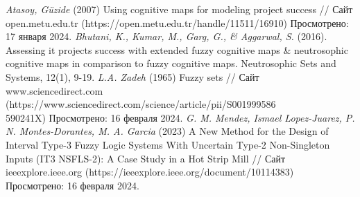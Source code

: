 \documentclass{article}
\begin{document}
\begin{minipage}{0.49\textwidth}
\begin{thebibliography}{}
             \textit{Atasoy, Güzide} (2007) Using cognitive maps for modeling project success // Сайт open.metu.edu.tr (https://open.metu.edu.tr/handle/11511/16910) Просмотрено: 17 января 2024.
             \textit{Bhutani, K., Kumar, M., Garg, G., \& Aggarwal, S.} (2016). Assessing it projects success with extended fuzzy cognitive maps \& neutrosophic cognitive maps in comparison to fuzzy cognitive maps. Neutrosophic Sets and Systems, 12(1), 9-19.
             \textit{L.A. Zadeh} (1965) Fuzzy sets // Сайт www.sciencedirect.com (https://www.sciencedirect.com/science/article/pii/S001999586\\590241X) Просмотрено: 16 февраля 2024.
             \textit{G. M. Mendez, Ismael Lopez-Juarez, P. N. Montes-Dorantes, M. A. Garcia} (2023) A New Method for the Design of Interval Type-3 Fuzzy Logic Systems With Uncertain Type-2 Non-Singleton Inputs (IT3 NSFLS-2): A Case Study in a Hot Strip Mill // Сайт ieeexplore.ieee.org (https://ieeexplore.ieee.org/document/10114383) Просмотрено: 16 февраля 2024.
        \end{thebibliography}
    \end{minipage}
\end{document}

